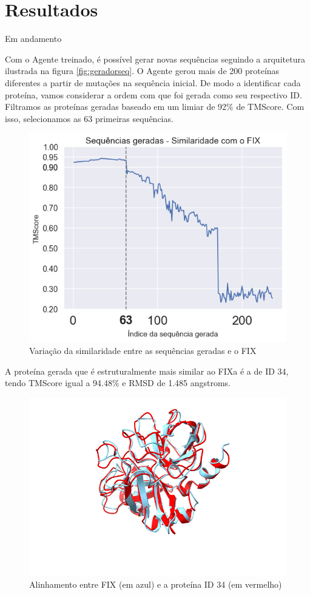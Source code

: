 \chapter{Resultados}

{\color{red} Em andamento}

Com o Agente treinado, é possível gerar novas sequências seguindo a arquitetura 
ilustrada na figura \ref{fig:geradorseq}. 
O Agente gerou mais de 200 proteínas diferentes a partir de mutações na sequência inicial. 
De modo a identificar cada proteína, 
vamos considerar a ordem com que foi gerada como seu respectivo ID.
Filtramos as proteínas geradas baseado em um limiar de 92\% de TMScore.
Com isso, selecionamos as 63 primeiras sequências.  

\begin{figure}[H]
    \centering
    \includegraphics[width=.6\linewidth]{figuras/plot_tmscore_decreasing.png}    
    \caption{Variação da similaridade entre as sequências geradas e o FIX }
    \label{fig:tmscore_decreasing}
  \end{figure}


A proteína gerada que é estruturalmente mais similar ao FIXa é a de ID 34,
tendo TMScore igual a 94.48\% e RMSD de 1.485 angstroms. 

\begin{figure}[H]
    \centering
    \includegraphics[width=.6\linewidth]{figuras/FIXvsID34.png}    
    \caption{Alinhamento entre FIX (em azul) e a proteína ID 34 (em vermelho)}
    \label{fig:FIX_vs_ID34}
\end{figure}


